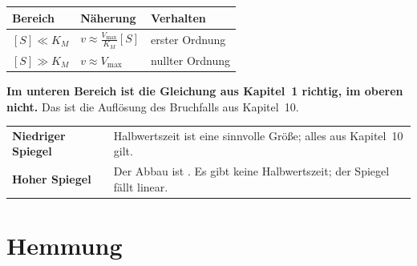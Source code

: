 \begin{merksatz}
\begin{center}
{\small
\renewcommand{\arraystretch}{1.5}
\begin{tabular}{@{}P{2.4cm}P{2.8cm}P{3.0cm}@{}}
\toprule
\textbf{Bereich} & \textbf{Näherung} & \textbf{Verhalten}\\
\midrule
$[S] \ll K_M$ & $v \approx \frac{V_{\max}}{K_M}[S]$ & \textcolor{gruen}{erster Ordnung}\\
$[S] \gg K_M$ & $v \approx V_{\max}$ & \textcolor{akzent}{nullter Ordnung}\\
\bottomrule
\end{tabular}}
\end{center}

\begin{center}
\begin{minipage}{0.9\textwidth}
\textbf{Im unteren Bereich ist die Gleichung aus Kapitel~1 richtig, im oberen nicht.} Das ist die Auflösung des Bruchfalls aus Kapitel~10.
\end{minipage}
\end{center}

\begin{center}
\renewcommand{\arraystretch}{1.5}
\begin{tabular}{@{}P{2.6cm}P{6.0cm}@{}}
\toprule
\textbf{Niedriger Spiegel} & Halbwertszeit ist eine sinnvolle Größe; alles aus Kapitel~10 gilt.\\
\textbf{Hoher Spiegel} & Der Abbau ist . Es gibt keine Halbwertszeit; der Spiegel fällt linear.\\
\bottomrule
\end{tabular}
\end{center}

\begin{center}
\begin{minipage}{0.88\textwidth}
\end{minipage}
\end{center}
\end{merksatz}

\section{Hemmung}

